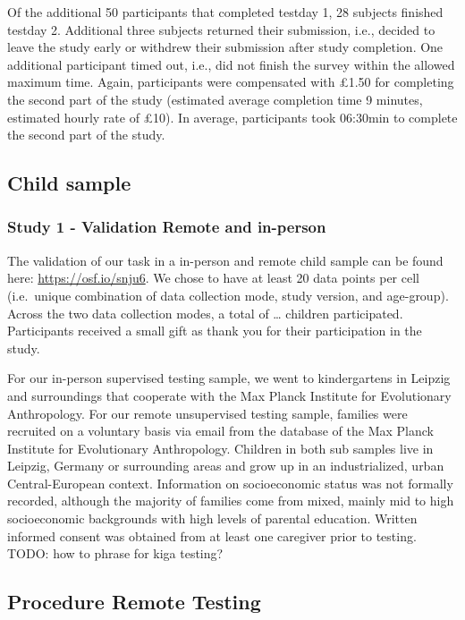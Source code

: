 \documentclass[
  man,floatsintext]{apa6}
\begin{document}
Of the additional 50 participants that completed testday 1, 28 subjects finished testday 2. Additional three subjects returned their submission, i.e., decided to leave the study early or withdrew their submission after study completion. One additional participant timed out, i.e., did not finish the survey within the allowed maximum time. Again, participants were compensated with £1.50 for completing the second part of the study (estimated average completion time 9 minutes, estimated hourly rate of £10). In average, participants took 06:30min to complete the second part of the study.

\hypertarget{child-sample}{%
\subsection{Child sample}\label{child-sample}}

\hypertarget{study-1---validation-remote-and-in-person}{%
\subsubsection{Study 1 - Validation Remote and in-person}\label{study-1---validation-remote-and-in-person}}

The validation of our task in a in-person and remote child sample can be found here: \url{https://osf.io/snju6}.
We chose to have at least 20 data points per cell (i.e.~unique combination of data collection mode, study version, and age-group). Across the two data collection modes, a total of \ldots{} children participated. Participants received a small gift as thank you for their participation in the study.

For our in-person supervised testing sample, we went to kindergartens in Leipzig and surroundings that cooperate with the Max Planck Institute for Evolutionary Anthropology. For our remote unsupervised testing sample, families were recruited on a voluntary basis via email from the database of the Max Planck Institute for Evolutionary Anthropology. Children in both sub samples live in Leipzig, Germany or surrounding areas and grow up in an industrialized, urban Central-European context. Information on socioeconomic status was not formally recorded, although the majority of families come from mixed, mainly mid to high socioeconomic backgrounds with high levels of parental education.
Written informed consent was obtained from at least one caregiver prior to testing.
TODO: how to phrase for kiga testing?

\hypertarget{procedure-remote-testing}{%
\subsection{Procedure Remote Testing}\label{procedure-remote-testing}}
\end{document}
